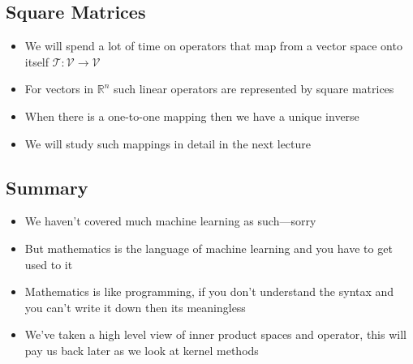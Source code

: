 
\begin{slide}
\section{Square Matrices}

\begin{PauseHighLight}
  \begin{itemize}
  \item We will spend a lot of time on operators that map from a vector
    space onto itself $\mathcal{T}: \mathcal{V}\rightarrow\mathcal{V}$\pause
  \item For vectors in $\mathbb{R}^n$ such linear operators are
    represented by square matrices\pause
  \item When there is a one-to-one mapping then we have a unique inverse\pause
  \item We will study such mappings in detail in the next lecture\pause
  \end{itemize}
\end{PauseHighLight}

\end{slide}


\begin{slide}
\section{Summary}

\begin{PauseHighLight}
  \begin{itemize}
  \item We haven't covered much machine learning as
    such\pause---sorry\pauseb
  \item But mathematics is the language of machine learning and you have
    to get used to it\pause
  \item Mathematics is like programming, if you don't understand the
    syntax and you can't write it down then its meaningless\pause
  \item We've taken a high level view of inner product spaces and
    operator, this will pay us back later as we look at kernel
    methods\pause
  \end{itemize}
\end{PauseHighLight}

\end{slide}



